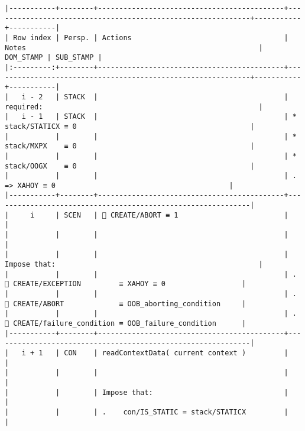 \documentclass[varwidth=\maxdimen,margin=0.5cm,multi={verbatim}]{standalone}
\begin{document}
\begin{verbatim}
|-----------+--------+--------------------------------------------+-------------------------------------------------------------+-----------+-----------|
| Row index | Persp. | Actions                                    | Notes                                                       | DOM_STAMP | SUB_STAMP |
|:---------:+--------+--------------------------------------------+-------------------------------------------------------------+-----------+-----------|
|   i - 2   | STACK  |                                            | required:                                                   |
|   i - 1   | STACK  |                                            | * stack/STATICX ≡ 0                                         |
|           |        |                                            | * stack/MXPX    ≡ 0                                         |
|           |        |                                            | * stack/OOGX    ≡ 0                                         |
|           |        |                                            | .      => XAHOY ≡ 0                                         |
|-----------+--------+--------------------------------------------+-------------------------------------------------------------|
|     i     | SCEN   |  CREATE/ABORT ≡ 1                         |                                                             |
|           |        |                                            |                                                             |
|           |        |                                            | Impose that:                                                |
|           |        |                                            | .    CREATE/EXCEPTION         ≡ XAHOY ≡ 0                  |
|           |        |                                            | .    CREATE/ABORT             ≡ OOB_aborting_condition     |
|           |        |                                            | .    CREATE/failure_condition ≡ OOB_failure_condition      |
|-----------+--------+--------------------------------------------+-------------------------------------------------------------|
|   i + 1   | CON    | readContextData( current context )         |                                                             |
|           |        |                                            |                                                             |
|           |        | Impose that:                               |                                                             |
|           |        | .    con/IS_STATIC = stack/STATICX         |                                                             |

\end{verbatim}
\end{document}
